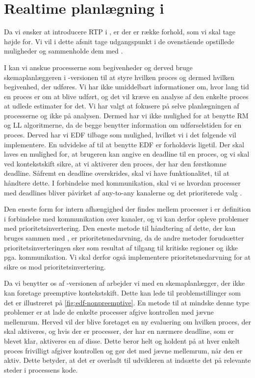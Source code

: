 \section{Realtime planlægning i \pycsp}
\label{sec:rtp-pycsp}
Da vi ønsker at introducere RTP i \pycsp, er der er række forhold, som vi skal tage højde for. Vi vil i dette afsnit tage udgangspunkt i de ovenstående opstillede muligheder og sammenholde dem med \pycsp. 

I \pycsp kan vi anskue processerne som begivenheder og derved bruge skemaplanlæggeren i -versionen til at styre hvilken proces og dermed hvilken begivenhed, der udføres. Vi har ikke umiddelbart informationer om, hvor lang tid en proces er om at blive udført, og det vil kræve en analyse af den enkelte proces at udlede estimater for det. Vi har valgt at fokusere på selve planlægningen af processerne og ikke på analysen. Dermed har vi ikke mulighed for at benytte RM og LL algoritmerne, da de begge benytter information om udførselstiden for en proces. Derved har vi EDF tilbage som mulighed, hvilket vi i det følgende vil implementere. En udvidelse af \pycsp til at benytte EDF er forholdsvis ligetil. Der skal laves en mulighed for, at brugeren kan angive en deadline til en proces, og vi skal ved kontekstskift sikre, at vi aktiverer den proces, der har den førstkomne deadline. Såfremt en deadline overskrides, skal vi have funktionalitet, til at håndtere dette. 
I forbindelse med kommunikation, skal vi se hvordan processer med deadlines bliver påvirket af  any-to-any kanalerne og det prioriterede valg .

Den eneste form for intern afhængighed der findes mellem processer i \pycsp er definition i forbindelse med kommunikation over kanaler, og vi kan derfor opleve problemer med prioritetsinvertering. Den eneste metode til håndtering af dette, der kan bruges sammen med \pycsp, er prioritetsnedarvning, da de andre metoder forudsætter prioritetsinverteringen  sker som resultat af tilgang til kritiske regioner og ikke pga. kommunikation. Vi skal derfor også implementere prioritetsnedarvning for at sikre os mod prioritetsinvertering. 

Da vi benytter os af -versionen af \pycsp arbejder vi med en skemaplanlægger, der ikke kan foretage preemptive kontekstskift. Dette kan lede til problemstillinger som det er illustreret på \cref{fig:edf-nonpreemptive}. En metode til at mindske denne type problemer er at lade de enkelte processer afgive kontrollen med jævne mellemrum. Herved vil der blive foretaget en ny evaluering om hvilken proces, der skal aktiveres, og hvis der er processer, der har en nærmere deadline, som er blevet klar, aktiveres en af disse. Dette beror helt og holdent på at hver enkelt proces frivilligt afgiver kontrollen og gør det med jævne mellemrum, når den er aktiv. Dette betyder, at det er overladt til udvikleren at indsætte det på relevante steder i processens kode. 

